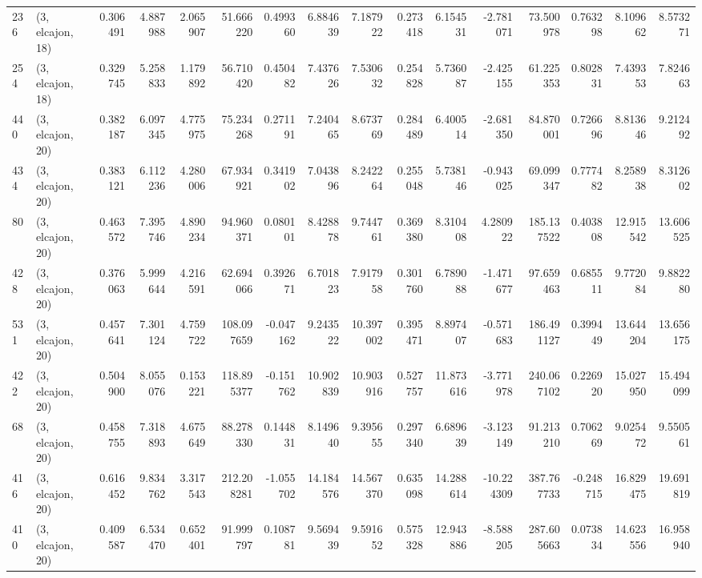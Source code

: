\begin{tabular}{llrrrrrrrrrrrrrr}
236 &  (3, elcajon, 18) &   0.306491 &   4.887988 &   2.065907 &    51.666220 &   0.499360 &   6.884639 &   7.187922 &  0.273418 &   6.154531 &  -2.781071 &     73.500978 &   0.763298 &    8.109662 &    8.573271 \\
254 &  (3, elcajon, 18) &   0.329745 &   5.258833 &   1.179892 &    56.710420 &   0.450482 &   7.437626 &   7.530632 &  0.254828 &   5.736087 &  -2.425155 &     61.225353 &   0.802831 &    7.439353 &    7.824663 \\
440 &  (3, elcajon, 20) &   0.382187 &   6.097345 &   4.775975 &    75.234268 &   0.271191 &   7.240465 &   8.673769 &  0.284489 &   6.400514 &  -2.681350 &     84.870001 &   0.726696 &    8.813646 &    9.212492 \\
434 &  (3, elcajon, 20) &   0.383121 &   6.112236 &   4.280006 &    67.934921 &   0.341902 &   7.043896 &   8.242264 &  0.255048 &   5.738146 &  -0.943025 &     69.099347 &   0.777482 &    8.258938 &    8.312602 \\
80  &  (3, elcajon, 20) &   0.463572 &   7.395746 &   4.890234 &    94.960371 &   0.080101 &   8.428878 &   9.744761 &  0.369380 &   8.310408 &   4.280922 &    185.137522 &   0.403808 &   12.915542 &   13.606525 \\
428 &  (3, elcajon, 20) &   0.376063 &   5.999644 &   4.216591 &    62.694066 &   0.392671 &   6.701823 &   7.917958 &  0.301760 &   6.789088 &  -1.471677 &     97.659463 &   0.685511 &    9.772084 &    9.882280 \\
531 &  (3, elcajon, 20) &   0.457641 &   7.301124 &   4.759722 &   108.097659 &  -0.047162 &   9.243522 &  10.397002 &  0.395471 &   8.897407 &  -0.571683 &    186.491127 &   0.399449 &   13.644204 &   13.656175 \\
422 &  (3, elcajon, 20) &   0.504900 &   8.055076 &   0.153221 &   118.895377 &  -0.151762 &  10.902839 &  10.903916 &  0.527757 &  11.873616 &  -3.771978 &    240.067102 &   0.226920 &   15.027950 &   15.494099 \\
68  &  (3, elcajon, 20) &   0.458755 &   7.318893 &   4.675649 &    88.278330 &   0.144831 &   8.149640 &   9.395655 &  0.297340 &   6.689639 &  -3.123149 &     91.213210 &   0.706269 &    9.025472 &    9.550561 \\
416 &  (3, elcajon, 20) &   0.616452 &   9.834762 &   3.317543 &   212.208281 &  -1.055702 &  14.184576 &  14.567370 &  0.635098 &  14.288614 & -10.224309 &    387.767733 &  -0.248715 &   16.829475 &   19.691819 \\
410 &  (3, elcajon, 20) &   0.409587 &   6.534470 &   0.652401 &    91.999797 &   0.108781 &   9.569439 &   9.591652 &  0.575328 &  12.943886 &  -8.588205 &    287.605663 &   0.073834 &   14.623556 &   16.958940 \\

\end{tabular}
